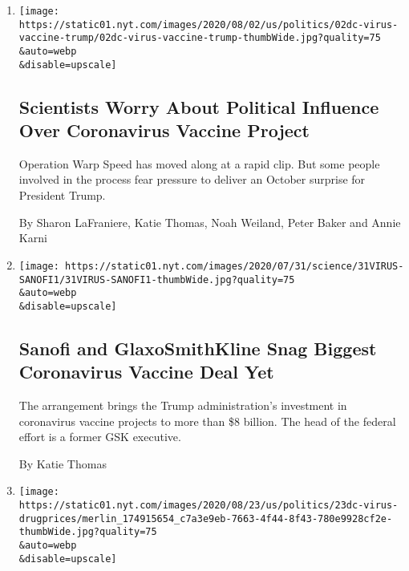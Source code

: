 \begin{enumerate}
\def\labelenumi{\arabic{enumi}.}
\item
  \href{/2020/08/02/us/politics/coronavirus-vaccine.html}{}

  \texttt{[image: https://static01.nyt.com/images/2020/08/02/us/politics/02dc-virus-vaccine-trump/02dc-virus-vaccine-trump-thumbWide.jpg?quality=75\\\&auto=webp\\\&disable=upscale]}

  \hypertarget{scientists-worry-about-political-influence-over-coronavirus-vaccine-project}{%
  \subsection{Scientists Worry About Political Influence Over
  Coronavirus Vaccine
  Project}\label{scientists-worry-about-political-influence-over-coronavirus-vaccine-project}}

  Operation Warp Speed has moved along at a rapid clip. But some people
  involved in the process fear pressure to deliver an October surprise
  for President Trump.

  By Sharon LaFraniere, Katie Thomas, Noah Weiland, Peter Baker and
  Annie Karni
\item
  \href{/2020/07/31/health/covid-19-vaccine-sanofi-gsk.html}{}

  \texttt{[image: https://static01.nyt.com/images/2020/07/31/science/31VIRUS-SANOFI1/31VIRUS-SANOFI1-thumbWide.jpg?quality=75\\\&auto=webp\\\&disable=upscale]}

  \hypertarget{sanofi-and-glaxosmithkline-snag-biggest-coronavirus-vaccine-deal-yet}{%
  \subsection{Sanofi and GlaxoSmithKline Snag Biggest Coronavirus
  Vaccine Deal
  Yet}\label{sanofi-and-glaxosmithkline-snag-biggest-coronavirus-vaccine-deal-yet}}

  The arrangement brings the Trump administration's investment in
  coronavirus vaccine projects to more than \$8 billion. The head of the
  federal effort is a former GSK executive.

  By Katie Thomas
\item
  \href{/2020/07/24/us/politics/trump-drug-prices-coronavirus.html}{}

  \texttt{[image: https://static01.nyt.com/images/2020/08/23/us/politics/23dc-virus-drugprices/merlin\_174915654\_c7a3e9eb-7663-4f44-8f43-780e9928cf2e-thumbWide.jpg?quality=75\\\&auto=webp\\\&disable=upscale]}


\end{enumerate}
